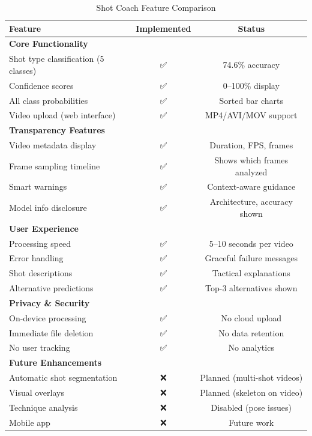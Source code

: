 \documentclass[11pt,a4paper]{article}
\begin{document}
\begin{table}[H]
\centering
\caption{Shot Coach Feature Comparison}
\begin{tabular}{lcc}
\toprule
Feature & Implemented & Status \\
\midrule
\textbf{Core Functionality} & & \\
\quad Shot type classification (5 classes) & ✅ & 74.6\% accuracy \\
\quad Confidence scores & ✅ & 0--100\% display \\
\quad All class probabilities & ✅ & Sorted bar charts \\
\quad Video upload (web interface) & ✅ & MP4/AVI/MOV support \\
\midrule
\textbf{Transparency Features} & & \\
\quad Video metadata display & ✅ & Duration, FPS, frames \\
\quad Frame sampling timeline & ✅ & Shows which frames analyzed \\
\quad Smart warnings & ✅ & Context-aware guidance \\
\quad Model info disclosure & ✅ & Architecture, accuracy shown \\
\midrule
\textbf{User Experience} & & \\
\quad Processing speed & ✅ & 5--10 seconds per video \\
\quad Error handling & ✅ & Graceful failure messages \\
\quad Shot descriptions & ✅ & Tactical explanations \\
\quad Alternative predictions & ✅ & Top-3 alternatives shown \\
\midrule
\textbf{Privacy \& Security} & & \\
\quad On-device processing & ✅ & No cloud upload \\
\quad Immediate file deletion & ✅ & No data retention \\
\quad No user tracking & ✅ & No analytics \\
\midrule
\textbf{Future Enhancements} & & \\
\quad Automatic shot segmentation & ❌ & Planned (multi-shot videos) \\
\quad Visual overlays & ❌ & Planned (skeleton on video) \\
\quad Technique analysis & ❌ & Disabled (pose issues) \\
\quad Mobile app & ❌ & Future work \\
\bottomrule
\end{tabular}
\end{table}
\end{document}
